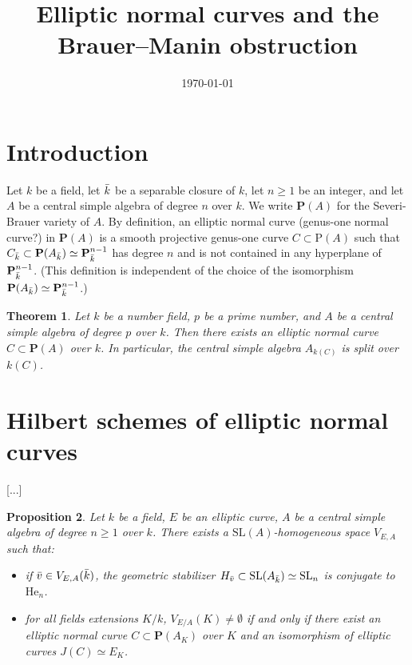 \documentclass[10pt,letterpaper,twoside]{article}
\title{Elliptic normal curves and the Brauer--Manin obstruction}
\author{}
\date{\today}
\renewcommand{\P}{\mathrm{P}}
\renewcommand{\1}{\mathbf{1}}
\newcommand{\bP}{\mathbf{P}}
\renewcommand{\geq}{\geqslant}
\theoremstyle{plain}
\newtheorem{theorem}{Theorem}[section]
\newtheorem{proposition}[theorem]{Proposition}
\theoremstyle{plain}
\theoremstyle{definition}
\theoremstyle{named}
\theoremstyle{definition}
\begin{document}
\maketitle
\tableofcontents



\section{Introduction}

Let $k$ be a field, let $\Bar{k}$ be a separable closure of $k$, let $n\geq 1$ be an integer, and let $A$ be a central simple algebra of degree $n$ over $k$. We write $\bP(A)$ for the Severi-Brauer variety of $A$. By definition, an elliptic normal curve (genus-one normal curve?) in $\bP(A)$ is a smooth projective genus-one curve $C\subset \P(A)$ such that $C_{\Bar{k}}\subset \bP(A_{\Bar{k}})\simeq \bP_{\Bar{k}}^{n-1}$ has degree $n$ and is not contained in any hyperplane of $\bP_{\Bar{k}}^{n-1}$. (This definition is independent of the choice of the isomorphism $\bP(A_{\Bar{k}})\simeq \bP_{\Bar{k}}^{n-1}$.)

\begin{theorem}\label{mainthm}
    Let $k$ be a number field, $p$ be a prime number, and $A$ be a central simple algebra of degree $p$ over $k$. Then there exists an elliptic normal curve $C\subset \bP(A)$ over $k$. In particular, the central simple algebra $A_{k(C)}$ is split over $k(C)$.
\end{theorem}


\section{Hilbert schemes of elliptic normal curves}


[...]

\begin{proposition}
    Let $k$ be a field, $E$ be an elliptic curve, $A$ be a central simple algebra of degree $n\geq 1$ over $k$. There exists a $\mathrm{SL}(A)$-homogeneous space $V_{E,A}$ such that:
    \begin{itemize}
    \item if $\Bar{v}\in V_{E,A}(\Bar{k})$, the geometric stabilizer $H_{\Bar{v}}\subset \mathrm{SL}(A_{\Bar{k}})\simeq \mathrm{SL}_n$ is conjugate to $\mathrm{He}_n$. 
    \item for all fields extensions $K/k$, $V_{E/A}(K)\neq\emptyset$ if and only if there exist an elliptic normal curve $C\subset \bP(A_K)$ over $K$ and an isomorphism of elliptic curves $J(C)\simeq E_K$.
    \end{itemize}
    
\end{proposition}
\end{document}
